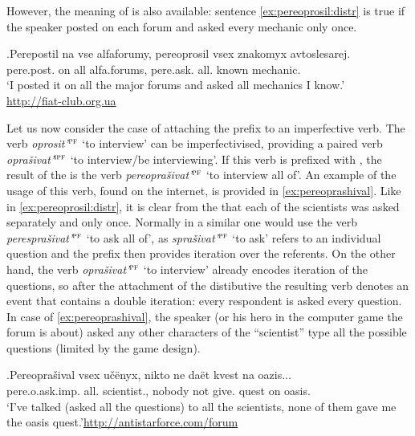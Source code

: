However, the  meaning of  is also available: sentence \ref{ex:pereoprosil:distr} is true if the speaker posted on each forum and asked every mechanic only once.

\exg.\label{ex:pereoprosil:distr}Perepostil na vse alfaforumy, pereoprosil vsex znakomyx avtoslesarej.\\ 
pere.post. on all {alfa.forums}, pere.ask. all. known mechanic.\\
\trans `I posted it on all the major forums and asked all mechanics I know.'\\\hbox{}\hfill\hbox{\url{http://fiat-club.org.ua}}

Let us now consider the case of attaching the prefix  to an imperfective verb. The verb \textit{oprosit'}$^{\textsc{pf}}$ `to interview' can be imperfectivised, providing a paired verb \textit{opra\v{s}ivat'}$^{\textsc{ipf}}$ `to interview/be interviewing'. If this verb is prefixed with , the result of the  is the verb \textit{pereopra\v{s}ivat'}$^{\textsc{pf}}$ `to interview all of'. An example of the usage of this verb, found on the internet, is provided in \ref{ex:pereoprashival}. Like in \ref{ex:pereoprosil:distr}, it is clear from the  that each of the scientists was asked separately and only once. Normally in a similar  one would use the verb \textit{perespra\v{s}ivat'}$^{\textsc{pf}}$ `to ask all of', as \textit{spra\v{s}ivat'}$^{\textsc{pf}}$ `to ask' refers to an individual question and the prefix  then provides iteration over the referents. On the other hand, the verb \textit{opra\v{s}ivat'}$^{\textsc{pf}}$ `to interview' already encodes iteration of the questions, so after the attachment of the distibutive  the resulting verb denotes an event that contains a double iteration: every respondent is asked every question. In case of \ref{ex:pereoprashival}, the speaker (or his hero in the computer game the forum is about) asked any other characters of the ``scientist'' type all the possible questions (limited by the game design).

\exg.\label{ex:pereoprashival}Pereopra\v{s}ival vsex u\v{c}\"{e}nyx, nikto ne da\"{e}t kvest na oazis...\\
pere.o.ask.imp. all. scientist., nobody not give. quest on oasis.\\
\trans `I've talked (asked all the questions) to all the scientists, none of them gave me the oasis quest.'\hbox{}\hfill\hbox{\url{http://antistarforce.com/forum}}

